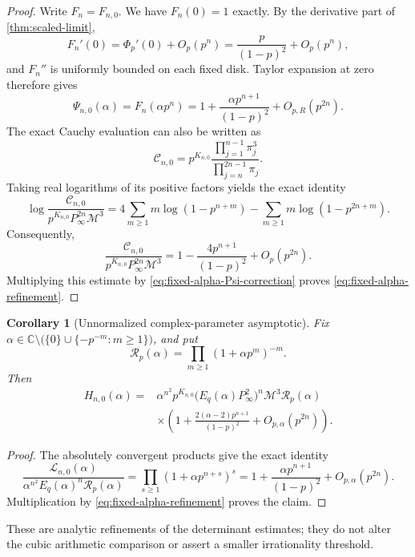\documentclass[11pt]{article}
\numberwithin{equation}{section}
\newtheorem{corollary}[corollary]{Corollary}
\theoremstyle{definition}
\theoremstyle{remark}
\newcommand{\C}{\mathbb{C}}
\begin{document}
\begin{proof}
Write $F_n=F_{n,0}$. We have $F_n(0)=1$ exactly. By the derivative
part of \cref{thm:scaled-limit},
\[
 F_n'(0)=\Phi_p'(0)+O_p(p^n)
 =\frac{p}{(1-p)^2}+O_p(p^n),
\]
and $F_n''$ is uniformly bounded on each fixed disk. Taylor expansion
at zero therefore gives
\begin{equation}\label{eq:fixed-alpha-Psi-correction}
 \Psi_{n,0}(\alpha)=F_n(\alpha p^n)
 =1+\frac{\alpha p^{n+1}}{(1-p)^2}+O_{p,R}(p^{2n}).
\end{equation}
The exact Cauchy evaluation can also be written as
\[
 \mathcal C_{n,0}
 =p^{K_{n,0}}
   \frac{\prod_{j=1}^{n-1}\pi_j^3}
        {\prod_{j=n}^{2n-1}\pi_j}.
\]
Taking real logarithms of its positive factors yields the exact identity
\[
 \log\frac{\mathcal C_{n,0}}
 {p^{K_{n,0}}P_\infty^{2n}\mathcal M^3}
 =4\sum_{m\ge1}m\log(1-p^{n+m})
  -\sum_{m\ge1}m\log(1-p^{2n+m}).
\]
Consequently,
\[
 \frac{\mathcal C_{n,0}}
 {p^{K_{n,0}}P_\infty^{2n}\mathcal M^3}
 =1-\frac{4p^{n+1}}{(1-p)^2}+O_p(p^{2n}).
\]
Multiplying this estimate by \eqref{eq:fixed-alpha-Psi-correction}
proves \eqref{eq:fixed-alpha-refinement}.
\end{proof}

\begin{corollary}[Unnormalized complex-parameter asymptotic]
\label{cor:unnormalized-full-asymptotic}
Fix $\alpha\in\C\setminus
\bigl(\{0\}\cup\{-p^{-m}:m\ge1\}\bigr)$, and put
\[
 \mathcal R_p(\alpha)
 =\prod_{m\ge1}(1+\alpha p^m)^{-m}.
\]
Then
\begin{equation}\label{eq:unnormalized-full-asymptotic}
 \begin{split}
 H_{n,0}(\alpha)
 ={}&\alpha^{n^2}p^{K_{n,0}}
 \bigl(E_q(\alpha)P_\infty^2\bigr)^n
 \mathcal M^3\mathcal R_p(\alpha)\\
 &\times\left(1+
 \frac{2(\alpha-2)p^{n+1}}{(1-p)^2}
 +O_{p,\alpha}(p^{2n})\right).
 \end{split}
\end{equation}
\end{corollary}

\begin{proof}
The absolutely convergent products give the exact identity
\[
 \frac{\mathcal L_{n,0}(\alpha)}
 {\alpha^{n^2}E_q(\alpha)^n\mathcal R_p(\alpha)}
 =\prod_{s\ge1}(1+\alpha p^{n+s})^s
 =1+\frac{\alpha p^{n+1}}{(1-p)^2}
   +O_{p,\alpha}(p^{2n}).
\]
Multiplication by \eqref{eq:fixed-alpha-refinement} proves the claim.
\end{proof}

These are analytic refinements of the determinant estimates; they do
not alter the cubic arithmetic comparison or assert a smaller
irrationality threshold.
\end{document}
